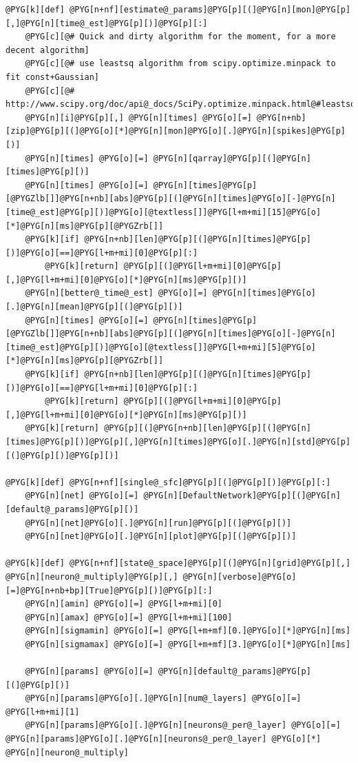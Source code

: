 \documentclass[letterpaper,10pt,english]{manual}
\begin{document}
\begin{Verbatim}[commandchars=@\[\]]
@PYG[k][def] @PYG[n+nf][estimate@_params]@PYG[p][(]@PYG[n][mon]@PYG[p][,]@PYG[n][time@_est]@PYG[p][)]@PYG[p][:]
    @PYG[c][@# Quick and dirty algorithm for the moment, for a more decent algorithm]
    @PYG[c][@# use leastsq algorithm from scipy.optimize.minpack to fit const+Gaussian]
    @PYG[c][@# http://www.scipy.org/doc/api@_docs/SciPy.optimize.minpack.html@#leastsq]
    @PYG[n][i]@PYG[p][,] @PYG[n][times] @PYG[o][=] @PYG[n+nb][zip]@PYG[p][(]@PYG[o][*]@PYG[n][mon]@PYG[o][.]@PYG[n][spikes]@PYG[p][)]
    @PYG[n][times] @PYG[o][=] @PYG[n][qarray]@PYG[p][(]@PYG[n][times]@PYG[p][)]
    @PYG[n][times] @PYG[o][=] @PYG[n][times]@PYG[p][@PYGZlb[]]@PYG[n+nb][abs]@PYG[p][(]@PYG[n][times]@PYG[o][-]@PYG[n][time@_est]@PYG[p][)]@PYG[o][@textless[]]@PYG[l+m+mi][15]@PYG[o][*]@PYG[n][ms]@PYG[p][@PYGZrb[]]
    @PYG[k][if] @PYG[n+nb][len]@PYG[p][(]@PYG[n][times]@PYG[p][)]@PYG[o][==]@PYG[l+m+mi][0]@PYG[p][:]
        @PYG[k][return] @PYG[p][(]@PYG[l+m+mi][0]@PYG[p][,]@PYG[l+m+mi][0]@PYG[o][*]@PYG[n][ms]@PYG[p][)]
    @PYG[n][better@_time@_est] @PYG[o][=] @PYG[n][times]@PYG[o][.]@PYG[n][mean]@PYG[p][(]@PYG[p][)]
    @PYG[n][times] @PYG[o][=] @PYG[n][times]@PYG[p][@PYGZlb[]]@PYG[n+nb][abs]@PYG[p][(]@PYG[n][times]@PYG[o][-]@PYG[n][time@_est]@PYG[p][)]@PYG[o][@textless[]]@PYG[l+m+mi][5]@PYG[o][*]@PYG[n][ms]@PYG[p][@PYGZrb[]]
    @PYG[k][if] @PYG[n+nb][len]@PYG[p][(]@PYG[n][times]@PYG[p][)]@PYG[o][==]@PYG[l+m+mi][0]@PYG[p][:]
        @PYG[k][return] @PYG[p][(]@PYG[l+m+mi][0]@PYG[p][,]@PYG[l+m+mi][0]@PYG[o][*]@PYG[n][ms]@PYG[p][)]
    @PYG[k][return] @PYG[p][(]@PYG[n+nb][len]@PYG[p][(]@PYG[n][times]@PYG[p][)]@PYG[p][,]@PYG[n][times]@PYG[o][.]@PYG[n][std]@PYG[p][(]@PYG[p][)]@PYG[p][)]

@PYG[k][def] @PYG[n+nf][single@_sfc]@PYG[p][(]@PYG[p][)]@PYG[p][:]
    @PYG[n][net] @PYG[o][=] @PYG[n][DefaultNetwork]@PYG[p][(]@PYG[n][default@_params]@PYG[p][)]
    @PYG[n][net]@PYG[o][.]@PYG[n][run]@PYG[p][(]@PYG[p][)]
    @PYG[n][net]@PYG[o][.]@PYG[n][plot]@PYG[p][(]@PYG[p][)]

@PYG[k][def] @PYG[n+nf][state@_space]@PYG[p][(]@PYG[n][grid]@PYG[p][,] @PYG[n][neuron@_multiply]@PYG[p][,] @PYG[n][verbose]@PYG[o][=]@PYG[n+nb+bp][True]@PYG[p][)]@PYG[p][:]
    @PYG[n][amin] @PYG[o][=] @PYG[l+m+mi][0]
    @PYG[n][amax] @PYG[o][=] @PYG[l+m+mi][100]
    @PYG[n][sigmamin] @PYG[o][=] @PYG[l+m+mf][0.]@PYG[o][*]@PYG[n][ms]
    @PYG[n][sigmamax] @PYG[o][=] @PYG[l+m+mf][3.]@PYG[o][*]@PYG[n][ms]

    @PYG[n][params] @PYG[o][=] @PYG[n][default@_params]@PYG[p][(]@PYG[p][)]
    @PYG[n][params]@PYG[o][.]@PYG[n][num@_layers] @PYG[o][=] @PYG[l+m+mi][1]
    @PYG[n][params]@PYG[o][.]@PYG[n][neurons@_per@_layer] @PYG[o][=] @PYG[n][params]@PYG[o][.]@PYG[n][neurons@_per@_layer] @PYG[o][*] @PYG[n][neuron@_multiply]


\end{Verbatim}
\end{document}
